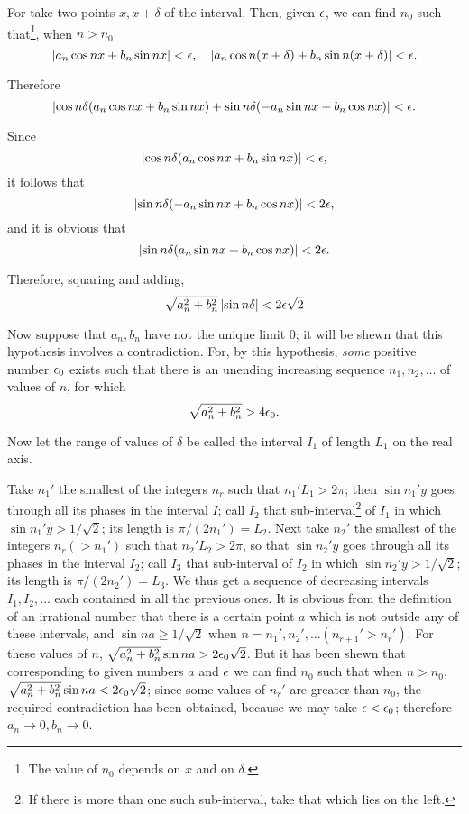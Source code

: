 For take two points $x, x+\delta$ of the interval. Then, given $\epsilon$, we can
find $n_{0}$ such that\footnote{The value of $n_{0}$ depends on $x$ and on $\delta$.},
when $n > n_{0}$
$$
\left| 
  a_{n} \cos nx + b_{n} \sin nx
 \right|
<
\epsilon,
\quad
\left| 
  a_{n} \cos n(x+\delta) + b_{n} \sin n(x+\delta)
 \right|
<
\epsilon.
$$

Therefore
$$
\left| 
  \cos n\delta
  (a_{n} \cos nx + b_{n} \sin nx)
  +
  \sin n\delta
  (-a_{n} \sin nx + b_{n} \cos nx)
 \right|
<
\epsilon.
$$

Since
$$
\left| 
  \cos n\delta
  (a_{n} \cos nx + b_{n} \sin nx)
 \right|
<
\epsilon,
$$
it follows that
$$
\left| 
  \sin n\delta
  (-a_{n} \sin nx + b_{n} \cos nx)
 \right|
<
2\epsilon,
$$
and it is obvious that
$$
\left| 
  \sin n\delta
  (a_{n} \sin nx + b_{n} \cos nx)
 \right|
<
2\epsilon.
$$

Therefore, squaring and adding,
$$
\sqrt{a_{n}^{2} + b_{n}^{2}}
\left|  \sin n\delta  \right|
<
2\epsilon\sqrt{2}
$$

Now suppose that $a_{n}, b_{n}$ have not the unique limit $0$; it will be shewn
that this hypothesis involves a contradiction. For, by this
hypothesis, \emph{some} positive number $\epsilon_{0}$ exists such that there is an
unending increasing sequence $n_{1}, n_{2}, \ldots$ of values of $n$, for which
$$
\sqrt{a_{n}^{2} + b_{n}^{2}} > 4\epsilon_{0}.
$$

Now let the range of values of $\delta$ be called the interval $I_{1}$ of length
$L_{1}$ on the real axis.

Take $n_{1}'$ the smallest of the integers $n_{r}$ such that
$n_{1}' L_{1} > 2\pi$; then
$\sin n_{1}'y$ goes through all its phases in the interval $I$; call
$I_{2}$
that sub-interval\footnote{If there is more than one such sub-interval,
  take that which lies on the left.}
of $I_{1}$ in which $\sin n_{1}'y > 1/\sqrt{2}$; its length is
$\pi / (2n_{1}') = L_{2}$. Next take $n_{2}'$ the smallest of the integers
$n_{r} (> n_{1}')$
such that $n_{2}' L_{2} > 2\pi$, so that
$\sin n_{2}'y$ goes through all its phases in
the interval $I_{2}$; call $I_{3}$ that sub-interval%
of $I_{2}$ in which $\sin n_{2}'y > 1/\sqrt{2}$;
its length is $\pi / (2 n_{2}') = L_{3}$. We thus get a sequence of
decreasing intervals $I_{1}, I_{2},\ldots$ each contained in all the previous
ones. It is obvious from the definition of an irrational number that
there is a certain point $a$ which is not outside any of these
intervals, and $\sin na \geq 1/\sqrt{2}$ when
$n=n_{1}', n_{2}', \ldots (n_{r+1}' > n_{r}')$.
For these values of $n$,
$\sqrt{a_{n}^{2} + b_{n}^{2}} \sin na > 2\epsilon_{0} \sqrt{2}$.
But it has been shewn that
corresponding
%
%
to given numbers $a$ and $\epsilon$ we can find $n_{0}$ such that when
$n > n_{0}$,
$\sqrt{a_{n}^{2} + b_{n}^{2}} \sin na < 2\epsilon_{0} \sqrt{2}$;
since some values of $n_{r}'$ are greater than $n_{0}$, the
required contradiction has been obtained, because we may take
$\epsilon < \epsilon_{0}$; therefore
$a_{n} \rightarrow 0, b_{n} \rightarrow 0$.

